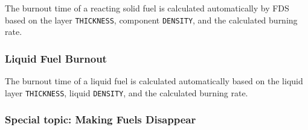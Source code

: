 \documentclass[11pt]{book}
\newcommand{\ct}{\tt\small}
\begin{document}
The burnout time of a reacting solid fuel is calculated automatically by FDS based on the
layer {\ct THICKNESS}, component {\ct DENSITY}, and the calculated burning rate.


\subsubsection{Liquid Fuel Burnout}

The burnout time of a liquid fuel is calculated automatically based on the liquid layer {\ct THICKNESS}, liquid {\ct DENSITY}, and the calculated burning rate.


\subsubsection{Special topic: Making Fuels Disappear}
\label{info:BURN_AWAY}
\end{document}
